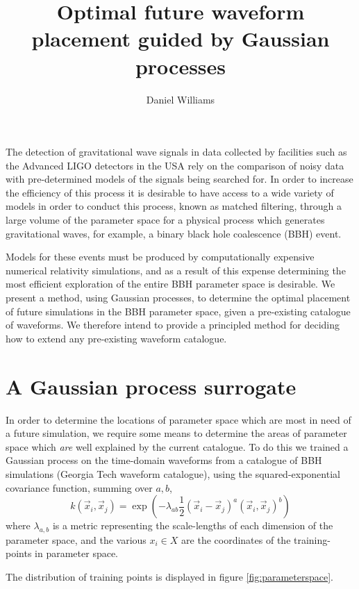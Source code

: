 \documentclass[a4paper]{article}
\title{Optimal future waveform placement guided by Gaussian processes}
\author{Daniel Williams}
\begin{document}
\maketitle


The detection of gravitational wave signals in data collected by
facilities such as the Advanced LIGO detectors in the USA rely on the
comparison of noisy data with pre-determined models of the signals
being searched for. In order to increase the efficiency of this
process it is desirable to have access to a wide variety of models in
order to conduct this process, known as matched filtering, through a
large volume of the parameter space for a physical process which
generates gravitational waves, for example, a binary black hole
coalescence (BBH) event.

Models for these events must be produced by computationally expensive
numerical relativity simulations, and as a result of this expense
determining the most efficient exploration of the entire BBH parameter
space is desirable. We present a method, using Gaussian processes, to
determine the optimal placement of future simulations in the BBH
parameter space, given a pre-existing catalogue of waveforms. We
therefore intend to provide a principled method for deciding how to
extend any pre-existing waveform catalogue.

\section{A Gaussian process surrogate}
\label{sec:surrogate}

In order to determine the locations of parameter space which are most
in need of a future simulation, we require some means to determine the
areas of parameter space which \emph{are} well explained by the
current catalogue. To do this we trained a Gaussian process on the
time-domain waveforms from a catalogue of BBH simulations (Georgia
Tech waveform catalogue), using the squared-exponential covariance
function, summing over $a, b$, 
\begin{equation}
  \label{eq:squaredexp}
  k(\vec{x}_i, \vec{x}_j) = \exp( - \lambda_{ab} \frac{1}{2} (\vec{x}_i - \vec{x}_j)^a (\vec{x}_i, \vec{x}_j)^b )
\end{equation}
where $\lambda_{a,b}$ is a metric representing the scale-lengths of
each dimension of the parameter space, and the various $x_i \in X$ are the
coordinates of the training-points in parameter space.

The distribution of training points is displayed in figure \ref{fig:parameterspace}.
\end{document}
